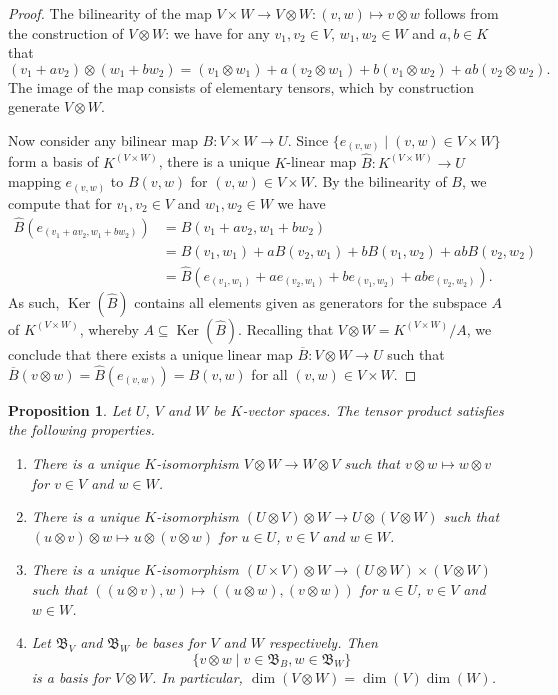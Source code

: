 \documentclass[12pt, leqno, british]{amsart}
\theoremstyle{definition}
\theoremstyle{plain}
\newtheorem{prop}[defi]{Proposition}
\theoremstyle{remark}
\newcommand{\mf}{\mathfrak}
\DeclareMathOperator{\Ker}{Ker}
\begin{document}
\begin{proof}
The bilinearity of the map $V \times W \to V \otimes W : (v, w) \mapsto v \otimes w$ follows from the construction of $V \otimes W$: we have for any $v_1, v_2 \in V$, $w_1, w_2 \in W$ and $a, b \in K$ that
$$ (v_1 + av_2) \otimes (w_1 + bw_2) = (v_1 \otimes w_1) + a(v_2 \otimes w_1) + b(v_1 \otimes w_2) + ab(v_2 \otimes w_2).$$
The image of the map consists of elementary tensors, which by construction generate $V \otimes W$.

Now consider any bilinear map $B : V \times W \to U$.
Since $\lbrace e_{(v, w)} \mid (v, w) \in V \times W \rbrace$ form a basis of $K^{(V \times W)}$, there is a unique $K$-linear map $\hat{B} : K^{(V \times W)} \to U$ mapping $e_{(v, w)}$ to $B(v, w)$ for $(v, w) \in V \times W$.
By the bilinearity of $B$, we compute that for $v_1, v_2 \in V$ and $w_1, w_2 \in W$ we have
\begin{align*}
\hat{B}(e_{(v_1 + av_2, w_1 + bw_2)}) &= B(v_1 + av_2, w_1 + bw_2) \\
&= B(v_1, w_1) + aB(v_2, w_1) + bB(v_1, w_2) + abB(v_2, w_2) \\
&= \hat{B}(e_{(v_1, w_1)} + ae_{(v_2, w_1)} + be_{(v_1, w_2)} + abe_{(v_2, w_2)}).
\end{align*}
As such, $\Ker(\hat{B})$ contains all elements given as generators for the subspace $A$ of $K^{(V \times W)}$, whereby $A \subseteq \Ker(\hat{B})$.
Recalling that $V \otimes W = K^{(V \times W)}/A$, we conclude that there exists a unique linear map $\overline{B} : V \otimes W \to U$ such that $\overline{B}(v \otimes w) = \hat{B}(e_{(v, w)}) = B(v, w)$ for all $(v, w) \in V \times W$.
\end{proof}
\begin{prop}\label{P:tensor-product-properties}
Let $U$, $V$ and $W$ be $K$-vector spaces.
The tensor product satisfies the following properties.
\begin{enumerate}
\item There is a unique $K$-isomorphism $V \otimes W \to W \otimes V$ such that $v \otimes w \mapsto w \otimes v$ for $v \in V$ and $w \in W$.
\item There is a unique $K$-isomorphism $(U \otimes V) \otimes W \to U \otimes (V \otimes W)$ such that $(u \otimes v) \otimes w \mapsto u \otimes (v \otimes w)$ for $u \in U$, $v \in V$ and $w \in W$.
\item There is a unique $K$-isomorphism $(U \times V) \otimes W \to (U \otimes W) \times (V \otimes W)$ such that $((u \otimes v), w) \mapsto ((u \otimes w), (v \otimes w))$ for $u \in U$, $v \in V$ and $w \in W$.
\item Let $\mf{B}_V$ and $\mf{B}_W$ be bases for $V$ and $W$ respectively.
Then
$$ \lbrace v \otimes w \mid v \in \mf{B}_B, w \in \mf{B}_W \rbrace $$
is a basis for $V \otimes W$.
In particular, $\dim(V \otimes W) = \dim(V)\dim(W)$.
\end{enumerate}
\end{prop}
\end{document}
